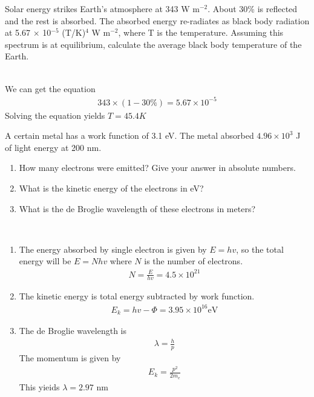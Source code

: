 \item Solar energy strikes Earth's atmosphere at 343 W m$^{-2}$. About 30\% is reflected and the rest is
absorbed. The absorbed energy re-radiates as black body radiation at 5.67 $\times$ 10$^{-5}$ (T/K)$^4$ W m$^{-2}$,
where T is the temperature. Assuming this spectrum is at equilibrium, calculate the average black
body temperature of the Earth.  \\

\begin{solution}\ \\
    We can get the equation
    \begin{align*}
        343\times(1-30\%)=5.67\times 10^{-5}
    \end{align*}
    Solving the equation yields $T=45.4K$
\end{solution}

\item A certain metal has a work function of 3.1 eV. The metal absorbed $4.96\times 10^3$ J of light energy at
200 nm.
\begin{enumerate}
    \item How many electrons were emitted? Give your answer in absolute numbers.
    \item What is the kinetic energy of the electrons in eV?
    \item What is the de Broglie wavelength of these electrons in meters?
\end{enumerate}

\begin{solution}\
    \begin{enumerate}
        \item The energy absorbed by single electron is given by $E=hv$, so the total
              energy will be $E=Nhv$ where $N$ is the number of electrons.
              \begin{align*}
                  N=\frac{E}{hv}=4.5\times10^{21}
              \end{align*}
        \item The kinetic energy is total energy subtracted by work function.
              \begin{align*}
                  E_k=hv-\Phi=3.95\times10^{16}\mathrm{eV}
              \end{align*}
        \item The de Broglie wavelength is
              \begin{align*}
                  \lambda=\frac{h}{p}
              \end{align*}
              The momentum is given by
              \begin{align*}
                  E_k=\frac{p^2}{2m_e}
              \end{align*}
              This yieids $\lambda=2.97$ nm
    \end{enumerate}
\end{solution}

